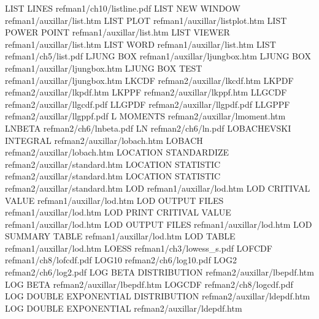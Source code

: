 LIST LINES                              refman1/ch10/listline.pdf
LIST NEW WINDOW                         refman1/auxillar/list.htm
LIST PLOT                               refman1/auxillar/listplot.htm
LIST POWER POINT                        refman1/auxillar/list.htm
LIST VIEWER                             refman1/auxillar/list.htm
LIST WORD                               refman1/auxillar/list.htm
LIST                                    refman1/ch5/list.pdf
LJUNG BOX                               refman1/auxillar/ljungbox.htm
LJUNG BOX                               refman1/auxillar/ljungbox.htm
LJUNG BOX TEST                          refman1/auxillar/ljungbox.htm
LKCDF                                   refman2/auxillar/lkcdf.htm
LKPDF                                   refman2/auxillar/lkpdf.htm
LKPPF                                   refman2/auxillar/lkppf.htm
LLGCDF                                  refman2/auxillar/llgcdf.pdf
LLGPDF                                  refman2/auxillar/llgpdf.pdf
LLGPPF                                  refman2/auxillar/llgppf.pdf
L MOMENTS                               refman2/auxillar/lmoment.htm
LNBETA                                  refman2/ch6/lnbeta.pdf
LN                                      refman2/ch6/ln.pdf
LOBACHEVSKI INTEGRAL                    refman2/auxillar/lobach.htm
LOBACH                                  refman2/auxillar/lobach.htm
LOCATION STANDARDIZE                    refman2/auxillar/standard.htm
LOCATION STATISTIC                      refman2/auxillar/standard.htm
LOCATION STATISTIC                      refman2/auxillar/standard.htm
LOD                                     refman1/auxillar/lod.htm
LOD CRITIVAL VALUE                      refman1/auxillar/lod.htm
LOD OUTPUT FILES                        refman1/auxillar/lod.htm
LOD PRINT CRITIVAL VALUE                refman1/auxillar/lod.htm
LOD OUTPUT FILES                        refman1/auxillar/lod.htm
LOD SUMMARY TABLE                       refman1/auxillar/lod.htm
LOD TABLE                               refman1/auxillar/lod.htm
LOESS                                   refman1/ch3/lowess_s.pdf
LOFCDF                                  refman1/ch8/lofcdf.pdf
LOG10                                   refman2/ch6/log10.pdf
LOG2                                    refman2/ch6/log2.pdf
LOG BETA DISTRIBUTION                   refman2/auxillar/lbepdf.htm
LOG BETA                                refman2/auxillar/lbepdf.htm
LOGCDF                                  refman2/ch8/logcdf.pdf
LOG DOUBLE EXPONENTIAL DISTRIBUTION     refman2/auxillar/ldepdf.htm
LOG DOUBLE EXPONENTIAL                  refman2/auxillar/ldepdf.htm
